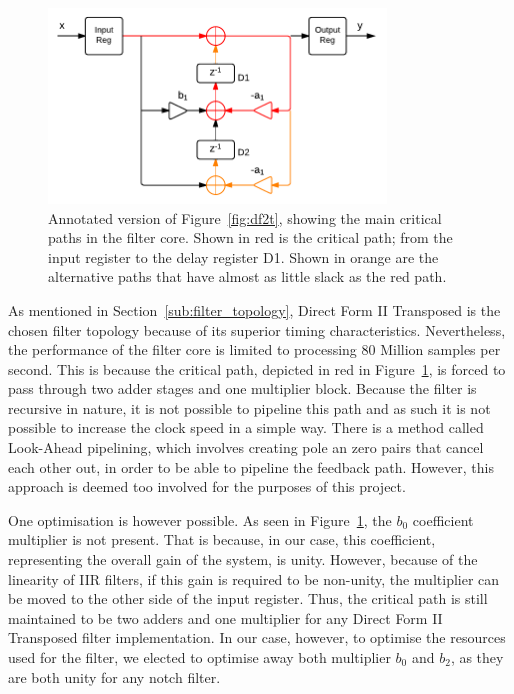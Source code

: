 \documentclass[]{article}
\begin{document}
\begin{figure}[tbp]
	\begin{center}
		\includegraphics[width = 0.8\textwidth]{DirectFormIITransposedCritpath.pdf}
	\end{center}
	\caption{Annotated version of Figure~\ref{fig:df2t}, showing the main critical paths in the filter core. Shown in red is the critical path; from the input register to the delay register D1. Shown in orange are the alternative paths that have almost as little slack as the red path.}
	\label{fig:df2tCritpath}
\end{figure}

As mentioned in Section~\ref{sub:filter_topology}, Direct Form II Transposed is the chosen filter topology because of its superior timing characteristics. Nevertheless, the performance of the filter core is limited to processing 80 Million samples per second.
This is because the critical path, depicted in red in Figure~\ref{fig:df2tCritpath}, is forced to pass through two adder stages and one multiplier block.
Because the filter is recursive in nature, it is not possible to pipeline this path and as such it is not possible to increase the clock speed in a simple way. There is a method called Look-Ahead pipelining, which involves creating pole an zero pairs that cancel each other out, in order to be able to pipeline the feedback path.
However, this approach is deemed too involved for the purposes of this project.

One optimisation is however possible. As seen in Figure~\ref{fig:df2tCritpath}, the $b_0$ coefficient multiplier is not present. That is because, in our case, this coefficient, representing the overall gain of the system, is unity.
However, because of the linearity of IIR filters, if this gain is required to be non-unity, the multiplier can be moved to the other side of the input register.
Thus, the critical path is still maintained to be two adders and one multiplier for any Direct Form II Transposed filter implementation.
In our case, however, to optimise the resources used for the filter, we elected to optimise away both multiplier $b_0$ and $b_2$, as they are both unity for any notch filter.
\end{document}
